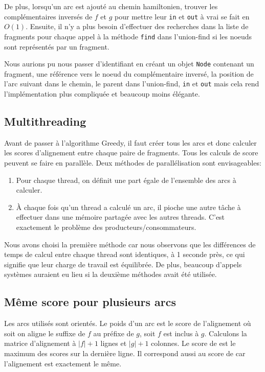 De plus, lorsqu'un arc  est ajouté au chemin hamiltonien,
trouver les complémentaires inversés de $f$ et $g$ pour mettre
leur \texttt{in} et \texttt{out} à vrai se fait en $O(1)$.
Ensuite, il n'y a plus besoin d'effectuer des recherches dans
la liste de fragments pour chaque appel à la méthode \texttt{find}
dans l'union-find si les noeuds sont représentés par un fragment.

Nous aurions pu nous passer d'identifiant en créant un objet \texttt{Node}
contenant un fragment, une référence vers le noeud du complémentaire inversé,
la position de l'arc suivant dans le chemin,
le parent dans l'union-find, \texttt{in} et \texttt{out} mais
cela rend l'implémentation plus compliquée et beaucoup moins élégante.

\subsection{Multithreading}
Avant de passer à l'algorithme Greedy, il faut créer tous les arcs et donc
calculer les scores d'alignement entre chaque paire de fragments.
Tous les calculs de score peuvent se faire en parallèle.
Deux méthodes de parallélisation sont envisageables:
\begin{enumerate}
\item Pour chaque thread, on définit une part égale de l'ensemble des arcs à calculer.
\item À chaque fois qu'un thread a calculé un arc, il pioche une autre tâche à
	effectuer dans une mémoire partagée avec les autres threads.
	C'est exactement le problème des producteurs/consommateurs. %
\end{enumerate}
Nous avons choisi la première méthode car nous observons que les différences
de temps de calcul entre chaque thread sont identiques, à 1 seconde près,
ce qui signifie que leur charge de travail est équilibrée.
De plus, beaucoup d'appels systèmes auraient eu lieu si la deuxième méthodes
avait été utilisée.

\subsection{Même score pour plusieurs arcs}
Les arcs utilisés sont orientés. Le poids d'un arc  est
le score de l'alignement où soit on aligne le suffixe de $f$ au préfixe de $g$,
soit $f$ est inclus à $g$. Calculons la matrice d'alignement à $|f|+1$ lignes et $|g|+1$ colonnes.
Le score de  est le maximum des scores sur la dernière ligne.
Il correspond aussi au score de  car l'alignement est exactement le même.\\

